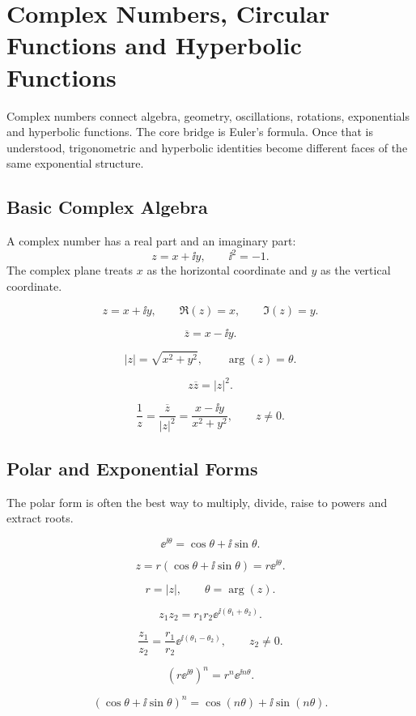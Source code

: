 \documentclass{otscience}
\begin{document}
\maketitle
\tableofcontents
\newpage
\fi

\section{Complex Numbers, Circular Functions and Hyperbolic Functions}

Complex numbers connect algebra, geometry, oscillations, rotations, exponentials and hyperbolic functions. The core bridge is Euler's formula. Once that is understood, trigonometric and hyperbolic identities become different faces of the same exponential structure.

\subsection{Basic Complex Algebra}

A complex number has a real part and an imaginary part:
\[
z=x+\ii y,
\qquad \ii^2=-1.
\]
The complex plane treats \(x\) as the horizontal coordinate and \(y\) as the vertical coordinate.

\begin{formulaboxnosplit}
\[
z=x+\ii y,
\qquad
\Re(z)=x,
\qquad
\Im(z)=y.
\]

\[
\overline{z}=x-\ii y.
\]

\[
|z|=\sqrt{x^2+y^2},
\qquad
\arg(z)=\theta.
\]

\[
z\overline{z}=|z|^2.
\]

\[
\frac{1}{z}=\frac{\overline{z}}{|z|^2}=\frac{x-\ii y}{x^2+y^2},\qquad z\neq0.
\]
\end{formulaboxnosplit}

\subsection{Polar and Exponential Forms}

The polar form is often the best way to multiply, divide, raise to powers and extract roots.

\begin{formulabox}
\[
\ee^{\ii\theta}=\cos\theta+\ii\sin\theta.
\]

\[
z=r(\cos\theta+\ii\sin\theta)=r\ee^{\ii\theta}.
\]

\[
r=|z|,
\qquad
\theta=\arg(z).
\]

\[
z_1z_2=r_1r_2\ee^{\ii(\theta_1+\theta_2)}.
\]

\[
\frac{z_1}{z_2}=\frac{r_1}{r_2}\ee^{\ii(\theta_1-\theta_2)},\qquad z_2\neq0.
\]

\[
{(r\ee^{\ii\theta})}^n=r^n\ee^{\ii n\theta}.
\]

\[
{(\cos\theta+\ii\sin\theta)}^n=\cos(n\theta)+\ii\sin(n\theta).
\]
\end{formulabox}
\end{document}
